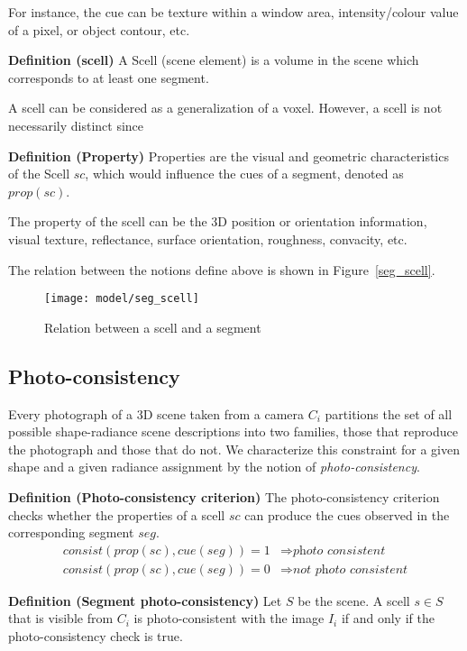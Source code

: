 For instance, the cue can be texture within a window area, intensity/colour value of a pixel, or object contour, etc.

\textbf{Definition (scell)} A Scell (scene element) is a volume in the scene which corresponds to at least one segment.

A scell can be considered as a generalization of a voxel. However, a scell is not necessarily distinct since

\textbf{Definition (Property)} Properties are the visual and geometric characteristics of the Scell $sc$, which would influence the cues of a segment, denoted as $prop(sc)$.

The property of the scell can be the 3D position or orientation information, visual texture, reflectance, surface orientation, roughness, convacity, etc.

The relation between the notions define above is shown in Figure~\ref{seg_scell}.
\begin{figure}[!htbp]
\centering
\texttt{[image: model/seg\_scell]}
\caption{Relation between a scell and a segment}
\end{figure}


\subsection{Photo-consistency}
Every photograph of a 3D scene taken from a camera $C_i$ partitions the set of all possible shape-radiance scene descriptions into two families, those that reproduce the photograph and those that do not. We characterize this constraint for a given shape and a given radiance assignment by the notion of \textit{photo-consistency}.

\textbf{Definition (Photo-consistency criterion)} The photo-consistency criterion checks whether the properties of a scell $sc$ can produce the cues observed in the corresponding segment $seg$.
\begin{align*}
consist(prop(sc), cue(seg)) = 1 &\Rightarrow \textit{photo consistent}\\
consist(prop(sc), cue(seg)) = 0 &\Rightarrow \textit{not photo consistent}
\end{align*}

\textbf{Definition (Segment photo-consistency)} Let $S$ be the scene. A scell $s\in S$ that is visible from $C_i$ is photo-consistent with the image $I_i$ if and only if the photo-consistency check is true.

